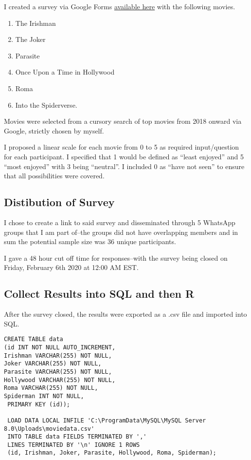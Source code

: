 \documentclass[
]{article}
\providecommand{\tightlist}{%
  \setlength{\itemsep}{0pt}\setlength{\parskip}{0pt}}
\begin{document}
I created a survey via Google Forms
\href{https://forms.gle/YthZSBA92WJ8YLai9}{available here} with the
following movies.

\begin{enumerate}
\def\labelenumi{\arabic{enumi}.}
\tightlist
\item
  The Irishman
\item
  The Joker
\item
  Parasite
\item
  Once Upon a Time in Hollywood
\item
  Roma
\item
  Into the Spiderverse.
\end{enumerate}

Movies were selected from a cursory search of top movies from 2018
onward via Google, strictly chosen by myself.

I proposed a linear scale for each movie from 0 to 5 as required
input/question for each participant. I specified that 1 would be defined
as ``least enjoyed'' and 5 ``most enjoyed'' with 3 being ``neutral''. I
included 0 as ``have not seen'' to ensure that all possibilities were
covered.

\hypertarget{distibution-of-survey}{%
\subsection{Distibution of Survey}\label{distibution-of-survey}}

I chose to create a link to said survey and disseminated through 5
WhatsApp groups that I am part of--the groups did not have overlapping
members and in sum the potential sample size was 36 unique participants.

I gave a 48 hour cut off time for responses--with the survey being
closed on Friday, February 6th 2020 at 12:00 AM EST.

\hypertarget{collect-results-into-sql-and-then-r}{%
\subsection{Collect Results into SQL and then
R}\label{collect-results-into-sql-and-then-r}}

After the survey closed, the results were exported as a .csv file and
imported into SQL.

\begin{verbatim}
CREATE TABLE data 
(id INT NOT NULL AUTO_INCREMENT, 
Irishman VARCHAR(255) NOT NULL, 
Joker VARCHAR(255) NOT NULL, 
Parasite VARCHAR(255) NOT NULL,
Hollywood VARCHAR(255) NOT NULL,
Roma VARCHAR(255) NOT NULL, 
Spiderman INT NOT NULL,
 PRIMARY KEY (id));
 
 LOAD DATA LOCAL INFILE 'C:\ProgramData\MySQL\MySQL Server 8.0\Uploads\moviedata.csv' 
 INTO TABLE data FIELDS TERMINATED BY ','
 LINES TERMINATED BY '\n' IGNORE 1 ROWS 
 (id, Irishman, Joker, Parasite, Hollywood, Roma, Spiderman);
\end{verbatim}
\end{document}
